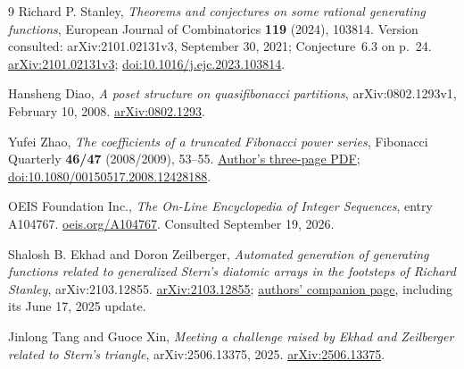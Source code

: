 \documentclass[11pt]{article}
\numberwithin{equation}{section}
\theoremstyle{definition}
\theoremstyle{remark}
\begin{document}
\begin{thebibliography}{9}
Richard P. Stanley,
\emph{Theorems and conjectures on some rational generating functions},
European Journal of Combinatorics \textbf{119} (2024), 103814.
Version consulted: arXiv:2101.02131v3, September 30, 2021;
Conjecture~6.3 on p.~24.
\href{https://arxiv.org/abs/2101.02131v3}{arXiv:2101.02131v3};
\href{https://doi.org/10.1016/j.ejc.2023.103814}{doi:10.1016/j.ejc.2023.103814}.

Hansheng Diao,
\emph{A poset structure on quasifibonacci partitions},
arXiv:0802.1293v1, February 10, 2008.
\href{https://arxiv.org/abs/0802.1293}{arXiv:0802.1293}.

Yufei Zhao,
\emph{The coefficients of a truncated Fibonacci power series},
Fibonacci Quarterly \textbf{46/47} (2008/2009), 53--55.
\href{https://yufeizhao.com/research/fibprod.pdf}{Author's three-page PDF};
\href{https://doi.org/10.1080/00150517.2008.12428188}{doi:10.1080/00150517.2008.12428188}.

OEIS Foundation Inc.,
\emph{The On-Line Encyclopedia of Integer Sequences}, entry A104767.
\href{https://oeis.org/A104767}{oeis.org/A104767}.
Consulted September 19, 2026.

Shalosh B. Ekhad and Doron Zeilberger,
\emph{Automated generation of generating functions related to generalized
Stern's diatomic arrays in the footsteps of Richard Stanley},
arXiv:2103.12855.
\href{https://arxiv.org/abs/2103.12855}{arXiv:2103.12855};
\href{https://sites.math.rutgers.edu/~zeilberg/mamarim/mamarimhtml/stern.html}{authors' companion page},
including its June 17, 2025 update.

Jinlong Tang and Guoce Xin,
\emph{Meeting a challenge raised by Ekhad and Zeilberger related to Stern's
triangle}, arXiv:2506.13375, 2025.
\href{https://arxiv.org/abs/2506.13375}{arXiv:2506.13375}.
\end{thebibliography}
\end{document}
